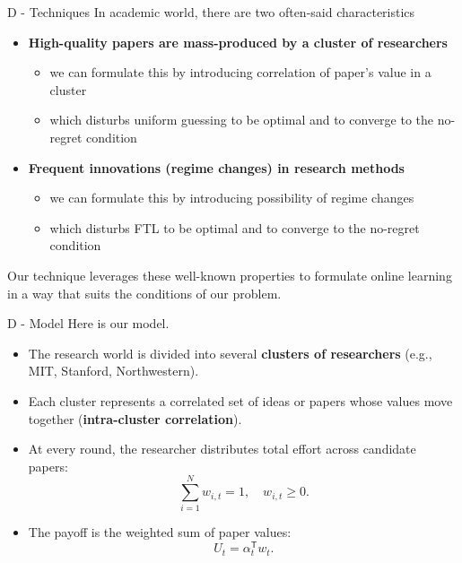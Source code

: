\documentclass{beamer}
\begin{document}
\begin{frame}{D - Techniques}
    In academic world, there are two often-said characteristics
    \begin{itemize}
        \item \textbf{High-quality papers are mass-produced by a cluster of researchers}
        \begin{itemize}
            \item we can formulate this by introducing correlation of paper's value in a cluster
            \item which disturbs uniform guessing to be optimal and to converge to the no-regret condition
        \end{itemize}
        \item \textbf{Frequent innovations (regime changes) in research methods}
        \begin{itemize}
            \item we can formulate this by introducing possibility of regime changes 
            \item which disturbs FTL to be optimal and to converge to the no-regret condition
        \end{itemize}
    \end{itemize}
    Our technique leverages these well-known properties to formulate online learning in a way that suits the conditions of our problem.
\end{frame}

\begin{frame}{D - Model}
Here is our model.
\begin{itemize}
    \item The research world is divided into several \textbf{clusters of researchers} 
          (e.g., MIT, Stanford, Northwestern).
    \item Each cluster represents a correlated set of ideas or papers whose values
          move together (\textbf{intra-cluster correlation}).
    \item At every round, the researcher distributes total effort 
          across candidate papers:
          \[
          \sum_{i=1}^{N} w_{i,t} = 1, \quad w_{i,t} \ge 0.
          \]
    \item The payoff is the weighted sum of paper values:
          \[
          U_t = \alpha_t^{\mathsf{T}} w_t.
          \]
\end{itemize}
\end{frame}
\end{document}
